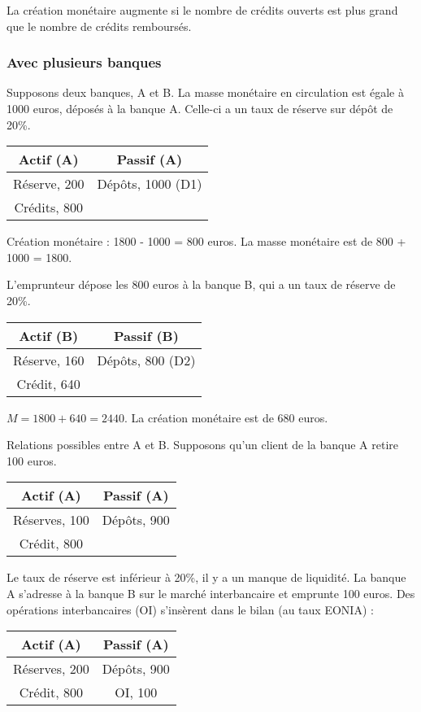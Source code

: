 	La création monétaire augmente si le nombre de crédits ouverts est plus grand que le nombre de crédits remboursés.
	
	
	\subsubsection{Avec plusieurs banques}
	
	Supposons deux banques, A et B. La masse monétaire en circulation est égale à 1000 euros, déposés à la banque A. Celle-ci a un taux de réserve sur dépôt de 20\%.
	
	\begin{tabular}{c|c}
	Actif (A) & Passif (A)\\ 
	\hline 
	Réserve, 200 & Dépôts, 1000 (D1) \\ 
	Crédits, 800 &  
	\end{tabular} 
	
	Création monétaire : 1800 - 1000 = 800 euros. La masse monétaire est de 800 + 1000 = 1800.
	
	L'emprunteur dépose les 800 euros à la banque B, qui a un taux de réserve de 20\%.
	
	\begin{tabular}{c|c}
	Actif (B) & Passif (B) \\ 
	\hline 
	Réserve, 160 & Dépôts, 800 (D2) \\ 
	Crédit, 640 &  
	\end{tabular} 
	
	$M = 1800 + 640 = 2440$. La création monétaire est de 680 euros.
	
	Relations possibles entre A et B. Supposons qu'un client de la banque A retire 100 euros.
	
	\begin{tabular}{c|c}
	Actif (A) & Passif (A) \\ 
	\hline 
	Réserves, 100 & Dépôts, 900 \\ 
	Crédit, 800 &  
	\end{tabular} 
	
	Le taux de réserve est inférieur à 20\%, il y a un manque de liquidité. La banque A s'adresse à la banque B sur le marché interbancaire et emprunte 100 euros. Des opérations interbancaires (OI) s'insèrent dans le bilan (au taux EONIA) :
	
	\begin{tabular}{c|c}
	Actif (A) & Passif (A) \\ 
	\hline 
	Réserves, 200 & Dépôts, 900 \\ 
	Crédit, 800 &   OI, 100
	\end{tabular}
	
